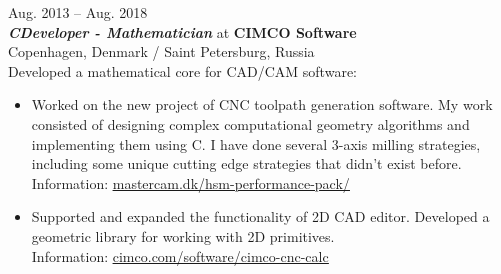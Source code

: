 \documentclass[a4paper,10pt]{article}
\def\CC{{C\nolinebreak[4]\hspace{-.05em}\raisebox{.4ex}{\tiny\bf ++}}}
\begin{document}
\begin{adjustbox}{valign=t}
\begin{minipage}{0.6\textwidth}
\textcolor{ColorOne}{Aug. 2013 -- Aug. 2018}\\
\emph{\textbf{\CC Developer - Mathematician}} at \textbf{CIMCO Software}\\
Copenhagen, Denmark / Saint Petersburg, Russia\\
\vspace{10 pt}
Developed a mathematical core for CAD/CAM software:
\begin{itemize}
	\item Worked on the new project of CNC toolpath generation software. My work consisted of designing complex 
		computational geometry algorithms and implementing them using \CC. I have done several 3-axis milling 
		strategies, including some unique cutting edge strategies that didn't exist before. \\
		Information: 
		\href{https://www.mastercam.dk/hsm-performance-pack/product/machining-strategies}
		{\underline{mastercam.dk/hsm-performance-pack/}}
	\item Supported and expanded the functionality of 2D CAD editor. Developed a geometric 
		library for working with 2D primitives.\\
		Information: 
		\href{https://www.cimco.com/software/cimco-cnc-calc}
		{\underline{cimco.com/software/cimco-cnc-calc}}
\end{itemize}


\end{minipage}
\end{adjustbox}
\end{document}
